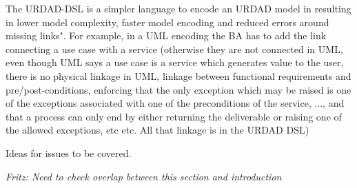 The URDAD-DSL is a simpler language to encode an URDAD model in resulting in lower model complexity, faster model encoding and reduced errors around missing links". For example, in a UML encoding the BA has to add the link connecting a use case with a service (otherwise they are not connected in UML, even though UML says a use case is a service which generates value to the user, there is no physical linkage in UML, linkage between functional requirements and pre/post-conditions, enforcing that the only exception which may be raised is one of the exceptions associated with one of the preconditions of the service, ..., and that a process can only end by either returning the deliverable or raising one of the allowed exceptions, etc etc. All that linkage is in the URDAD DSL)







Ideas for issues to be covered.

{\em Fritz: Need to check overlap between this section and introduction}

